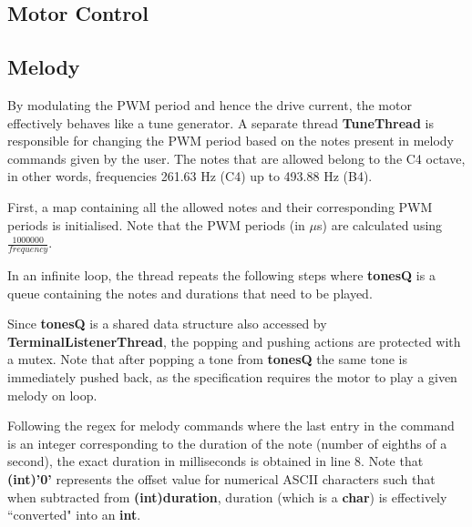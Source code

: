 \documentclass{article}
\begin{document}
\subsection{Motor Control}

\subsection{Melody}

By modulating the PWM period and hence the drive current, the motor effectively behaves like a tune generator. A separate thread \textbf{TuneThread} is responsible for changing the PWM period based on the notes present in melody commands given by the user. The notes that are allowed belong to the C4 octave, in other words, frequencies 261.63 Hz (C4) up to 493.88 Hz (B4).   

\bigskip

First, a map containing all the allowed notes and their corresponding PWM periods is initialised. Note that the PWM periods (in $\mu$s) are calculated using $\frac{1000000}{frequency}$. 

\bigskip



\bigskip

In an infinite loop, the thread repeats the following steps where \textbf{tonesQ} is a queue containing the notes and durations that need to be played. 

\bigskip



\bigskip

Since \textbf{tonesQ} is a shared data structure also accessed by \textbf{TerminalListenerThread}, the popping and pushing actions are protected with a mutex. Note that after popping a tone from \textbf{tonesQ} the same tone is immediately pushed back, as the specification requires the motor to play a given melody on loop. 

\bigskip

Following the regex for melody commands where the last entry in the command is an integer corresponding to the duration of the note (number of eighths of a second), the exact duration in milliseconds is obtained in line 8. Note that \textbf{(int)'0'} represents the offset value for numerical ASCII characters such that when subtracted from \textbf{(int)duration}, duration (which is a \textbf{char}) is effectively ``converted" into an \textbf{int}. 
\end{document}
